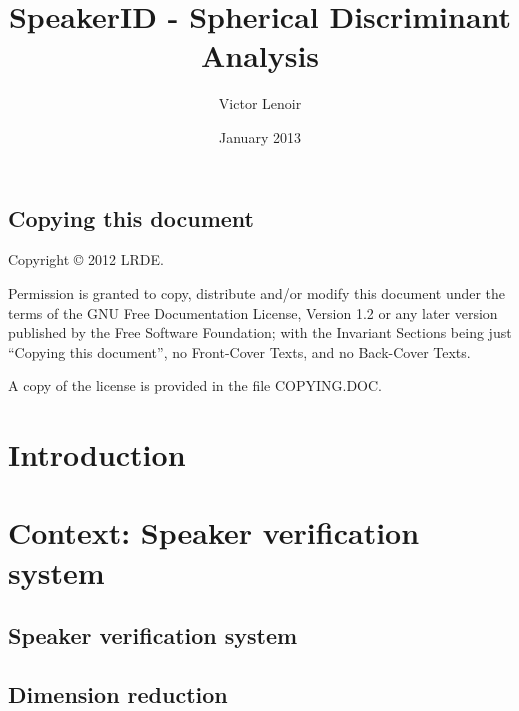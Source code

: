\documentclass{techrep} %
\title{SpeakerID - Spherical Discriminant Analysis}
\author{Victor Lenoir} \revision$LastChangedRevision: 2340 $
\date{January 2013} \email{lenoir@lrde.epita.fr}
\begin{document}
\section*{Copying this document}
Copyright \copyright{} 2012 LRDE.

Permission is granted to copy, distribute and/or modify this document under
the terms of the GNU Free Documentation License, Version 1.2 or any later
version published by the Free Software Foundation; with the Invariant Sections
being just ``Copying this document'', no Front-Cover Texts, and no Back-Cover
Texts.

A copy of the license is provided in the file COPYING.DOC.

\tableofcontents

\newpage
\chapter*{Introduction}
\chapter{Context: Speaker verification system}
\section{Speaker verification system}
\section{Dimension reduction}
\end{document}
